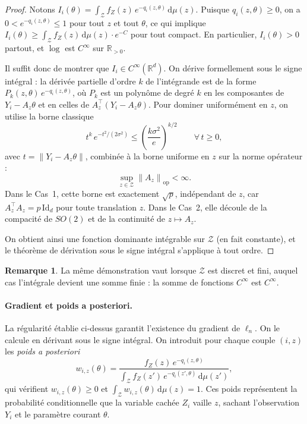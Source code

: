 \documentclass[12pt, a4paper]{article}
\theoremstyle{definition}
\newtheorem{remark}[theorem]{Remarque}
\newcommand{\R}{\mathbb{R}}
\newcommand{\Zcal}{\mathcal{Z}}
\newcommand{\norm}[1]{\left\|#1\right\|}
\newcommand{\Id}{\mathrm{Id}}
\begin{document}
\begin{proof}
Notons $I_i(\theta) = \int_\Zcal f_Z(z)\, e^{-q_i(z,\theta)}\,\mathrm{d}\mu(z)$.
Puisque $q_i(z,\theta) \geq 0$, on a $0 < e^{-q_i(z,\theta)} \leq 1$ pour tout $z$ et tout
$\theta$, ce qui implique $I_i(\theta) \geq \int_\Zcal f_Z(z)\,\mathrm{d}\mu(z) \cdot e^{-C}$
pour tout compact. En particulier, $I_i(\theta) > 0$ partout, et $\log$ est $C^\infty$
sur $\R_{>0}$.

Il suffit donc de montrer que $I_i \in C^\infty(\R^d)$. On dérive formellement sous
le signe intégral : la dérivée partielle d'ordre $k$ de l'intégrande est de la forme
$P_k(z,\theta)\, e^{-q_i(z,\theta)}$, où $P_k$ est un polynôme de degré $k$ en les
composantes de $Y_i - A_z\theta$ et en celles de $A_z^\top(Y_i - A_z\theta)$.
Pour dominer uniformément en $z$, on utilise la borne classique
\[
    t^k\, e^{-t^2/(2\sigma^2)} \leq \left(\frac{k\sigma^2}{e}\right)^{k/2}
    \qquad \forall\, t \geq 0,
\]
avec $t = \norm{Y_i - A_z\theta}$, combinée à la borne uniforme en $z$ sur la norme
opérateur :
\[
    \sup_{z \in \Zcal} \norm{A_z}_{\mathrm{op}} < \infty.
\]
Dans le Cas~1, cette borne est exactement $\sqrt{p}$, indépendant de $z$, car $A_z^\top A_z = p\,\Id_d$
pour toute translation $z$. Dans le Cas~2, elle découle de la compacité de $SO(2)$
et de la continuité de $z \mapsto A_z$.

On obtient ainsi une fonction dominante intégrable sur $\Zcal$ (en fait constante),
et le théorème de dérivation sous le signe intégral s'applique à tout ordre.
\end{proof}

\begin{remark}
    La même démonstration vaut lorsque $\Zcal$ est discret et fini, auquel cas
    l'intégrale devient une somme finie : la somme de fonctions $C^\infty$
    est $C^\infty$.
\end{remark}

\paragraph{Gradient et poids a posteriori.}

La régularité établie ci-dessus garantit l'existence du gradient de $\ell_n$.
On le calcule en dérivant sous le signe intégral. On introduit pour chaque
couple $(i, z)$ les \emph{poids a posteriori}
\begin{equation}
    w_{i,z}(\theta)
    = \frac{f_Z(z)\, e^{-q_i(z,\theta)}}
           {\displaystyle\int_\Zcal f_Z(z')\, e^{-q_i(z',\theta)}\,\mathrm{d}\mu(z')},
    \label{eq:poids_aposteriori}
\end{equation}
qui vérifient $w_{i,z}(\theta) \geq 0$ et $\int_\Zcal w_{i,z}(\theta)\,\mathrm{d}\mu(z) = 1$.
Ces poids représentent la probabilité conditionnelle que la variable cachée $Z_i$
vaille $z$, sachant l'observation $Y_i$ et le paramètre courant $\theta$.
\end{document}
